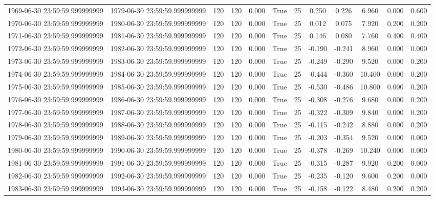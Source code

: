\begin{table}
\begin{tabular}{lccccccccccc}
1969-06-30 23:59:59.999999999 & 1979-06-30 23:59:59.999999999 & 120 & 120 & 0.000 & True & 25 & 0.250 & 0.226 & 6.960 & 0.000 & 0.600 \\
1970-06-30 23:59:59.999999999 & 1980-06-30 23:59:59.999999999 & 120 & 120 & 0.000 & True & 25 & 0.012 & 0.075 & 7.920 & 0.200 & 0.200 \\
1971-06-30 23:59:59.999999999 & 1981-06-30 23:59:59.999999999 & 120 & 120 & 0.000 & True & 25 & 0.146 & 0.080 & 7.760 & 0.400 & 0.400 \\
1972-06-30 23:59:59.999999999 & 1982-06-30 23:59:59.999999999 & 120 & 120 & 0.000 & True & 25 & -0.190 & -0.241 & 8.960 & 0.000 & 0.000 \\
1973-06-30 23:59:59.999999999 & 1983-06-30 23:59:59.999999999 & 120 & 120 & 0.000 & True & 25 & -0.249 & -0.290 & 9.520 & 0.000 & 0.200 \\
1974-06-30 23:59:59.999999999 & 1984-06-30 23:59:59.999999999 & 120 & 120 & 0.000 & True & 25 & -0.444 & -0.360 & 10.400 & 0.000 & 0.200 \\
1975-06-30 23:59:59.999999999 & 1985-06-30 23:59:59.999999999 & 120 & 120 & 0.000 & True & 25 & -0.530 & -0.486 & 10.800 & 0.000 & 0.200 \\
1976-06-30 23:59:59.999999999 & 1986-06-30 23:59:59.999999999 & 120 & 120 & 0.000 & True & 25 & -0.308 & -0.276 & 9.680 & 0.000 & 0.200 \\
1977-06-30 23:59:59.999999999 & 1987-06-30 23:59:59.999999999 & 120 & 120 & 0.000 & True & 25 & -0.322 & -0.309 & 9.840 & 0.000 & 0.200 \\
1978-06-30 23:59:59.999999999 & 1988-06-30 23:59:59.999999999 & 120 & 120 & 0.000 & True & 25 & -0.115 & -0.242 & 8.880 & 0.000 & 0.200 \\
1979-06-30 23:59:59.999999999 & 1989-06-30 23:59:59.999999999 & 120 & 120 & 0.000 & True & 25 & -0.203 & -0.354 & 9.520 & 0.000 & 0.000 \\
1980-06-30 23:59:59.999999999 & 1990-06-30 23:59:59.999999999 & 120 & 120 & 0.000 & True & 25 & -0.378 & -0.269 & 10.240 & 0.000 & 0.000 \\
1981-06-30 23:59:59.999999999 & 1991-06-30 23:59:59.999999999 & 120 & 120 & 0.000 & True & 25 & -0.315 & -0.287 & 9.920 & 0.200 & 0.000 \\
1982-06-30 23:59:59.999999999 & 1992-06-30 23:59:59.999999999 & 120 & 120 & 0.000 & True & 25 & -0.235 & -0.120 & 9.600 & 0.200 & 0.000 \\
1983-06-30 23:59:59.999999999 & 1993-06-30 23:59:59.999999999 & 120 & 120 & 0.000 & True & 25 & -0.158 & -0.122 & 8.480 & 0.200 & 0.200 \\

\end{tabular}
\end{table}
